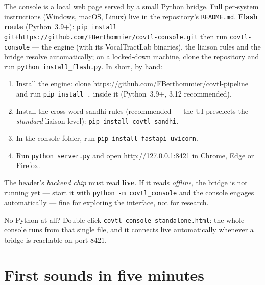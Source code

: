 \documentclass[11pt,a4paper]{article}
\begin{document}
The console is a local web page served by a small Python bridge. Full
per-system instructions (Windows, macOS, Linux) live in the repository's \texttt{README.md}. \textbf{Flash
route} (Python~3.9+): \texttt{pip install
git+https://github.com/FBerthommier/covtl-console.git} then run
\texttt{covtl-console} --- the engine (with its VocalTractLab
binaries), the liaison rules and the bridge resolve automatically; on
a locked-down machine, clone the repository and run
\texttt{python install\_flash.py}. In short, by hand:

\begin{enumerate}
\item Install the engine: clone
  \url{https://github.com/FBerthommier/covtl-pipeline} and run
  \texttt{pip install .} inside it (Python~3.9+, 3.12 recommended).
\item Install the cross-word sandhi rules (recommended --- the UI
  preselects the \emph{standard} liaison level):
  \texttt{pip install covtl-sandhi}.
\item In the console folder, run \texttt{pip install fastapi uvicorn}.
\item Run \texttt{python server.py} and open \url{http://127.0.0.1:8421}
  in Chrome, Edge or Firefox.
\end{enumerate}

The header's \emph{backend chip} must read \textbf{live}. If it reads
\emph{offline}, the bridge is not running yet --- start it with
\texttt{python -m covtl\_console} and the console engages automatically
--- fine for exploring the interface, not for research.

No Python at all? Double-click \texttt{covtl-console-standalone.html}:
the whole console runs from that single file, and it connects
live automatically whenever a bridge is reachable on port 8421.

\section{First sounds in five minutes}
\end{document}
